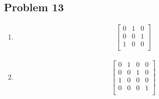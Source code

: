 \documentclass[a4paper,11pt]{article}
\begin{document}
\subsection*{Problem 13}
\begin{enumerate}[label=\alph*]
\item 
\begin{align}
\begin{bmatrix}
0  & 1 & 0 \\
0  & 0 & 1 \\
1  & 0 & 0 \\
\end{bmatrix}
\end{align}
\item 
\begin{align}
\begin{bmatrix}
0  & 1 & 0 & 0 \\
0  & 0 & 1 & 0 \\
1  & 0 & 0 & 0 \\
0  & 0 & 0 & 1 \\
\end{bmatrix}
\end{align}
\end{enumerate}
\end{document}

